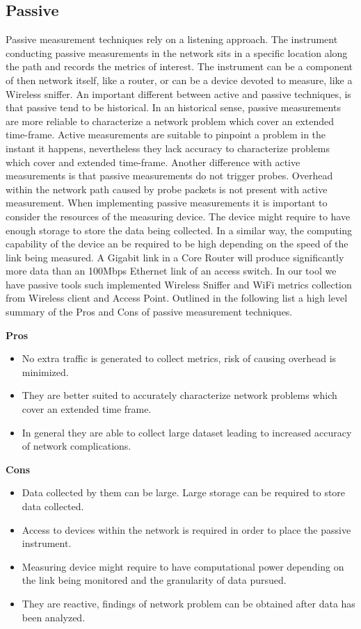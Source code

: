 \subsection*{Passive}

Passive measurement techniques rely on a listening approach. The instrument conducting passive measurements in the network sits in a specific location along the path and records the metrics of interest. The instrument can be a component of then network itself, like a router, or can be a device devoted to measure, like a Wireless sniffer. An important different between active and passive techniques, is that passive tend to be historical. In an historical sense, passive measurements are more reliable to characterize a network problem which cover an extended time-frame. Active measurements are suitable to pinpoint a problem in the instant it happens, nevertheless they lack accuracy to characterize problems which cover and extended time-frame. Another difference with active measurements is that passive measurements do not trigger probes. Overhead within the network path caused by probe packets is not present with active measurement. When implementing passive measurements it is important to consider the resources of the measuring device. The device might require to have enough storage to store the data being collected. In a similar way, the computing capability of the device an be required to be high depending on the speed of the link being measured. A Gigabit link in a Core Router will produce significantly more data than an 100Mbps Ethernet link of an access switch. In our tool we have passive tools such implemented Wireless Sniffer and WiFi metrics collection from Wireless client and Access Point.
Outlined in the following list a high level summary of the Pros and Cons of passive measurement techniques.

\textbf{Pros}
\begin{itemize}
	\item No extra traffic is generated to collect metrics, risk of causing overhead is minimized.
	\item They are better suited to accurately characterize network problems which cover an extended time frame.
	\item In general they are able to collect large dataset leading to increased accuracy of network complications.

\end{itemize}


\textbf{Cons}
\begin{itemize}
	\item Data collected by them can be large. Large storage can be required to store data collected.
	\item Access to devices within the network is required in order to place the passive instrument.
	\item Measuring device might require to have computational power depending on the link being monitored and the granularity of data pursued.
	\item They are reactive, findings of network problem can be obtained after data has been analyzed.
	
\end{itemize}

